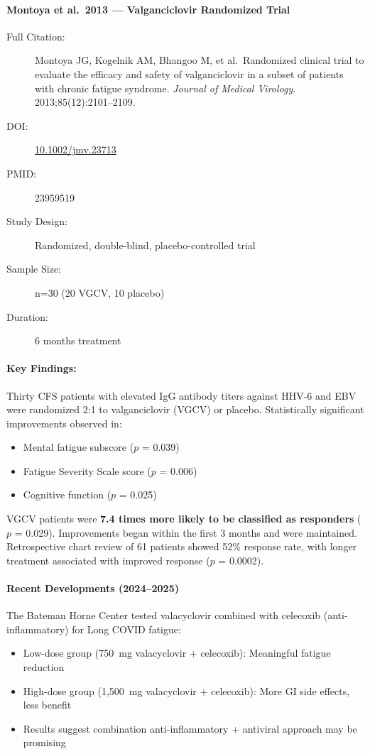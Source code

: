 \paragraph{Montoya et al.\ 2013 --- Valganciclovir Randomized Trial}

\begin{description}
    \item[Full Citation:] Montoya JG, Kogelnik AM, Bhangoo M, et al.\ Randomized clinical trial to evaluate the efficacy and safety of valganciclovir in a subset of patients with chronic fatigue syndrome. \textit{Journal of Medical Virology}. 2013;85(12):2101--2109.
    \item[DOI:] \href{https://doi.org/10.1002/jmv.23713}{10.1002/jmv.23713}
    \item[PMID:] 23959519
    \item[Study Design:] Randomized, double-blind, placebo-controlled trial
    \item[Sample Size:] n=30 (20 VGCV, 10 placebo)
    \item[Duration:] 6 months treatment
\end{description}

\paragraph{Key Findings:}
Thirty CFS patients with elevated IgG antibody titers against HHV-6 and EBV were randomized 2:1 to valganciclovir (VGCV) or placebo. Statistically significant improvements observed in:
\begin{itemize}
    \item Mental fatigue subscore ($p$ = 0.039)
    \item Fatigue Severity Scale score ($p$ = 0.006)
    \item Cognitive function ($p$ = 0.025)
\end{itemize}
VGCV patients were \textbf{7.4 times more likely to be classified as responders} ($p$ = 0.029). Improvements began within the first 3 months and were maintained. Retrospective chart review of 61 patients showed 52\% response rate, with longer treatment associated with improved response ($p$ = 0.0002).

\paragraph{Recent Developments (2024--2025)}

The Bateman Horne Center tested valacyclovir combined with celecoxib (anti-inflammatory) for Long COVID fatigue:
\begin{itemize}
    \item Low-dose group (750~mg valacyclovir + celecoxib): Meaningful fatigue reduction
    \item High-dose group (1,500~mg valacyclovir + celecoxib): More GI side effects, less benefit
    \item Results suggest combination anti-inflammatory + antiviral approach may be promising
\end{itemize}

